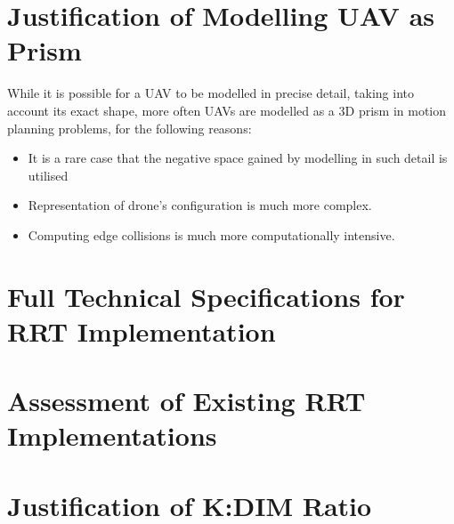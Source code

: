 
\section{Justification of Modelling UAV as Prism}
\label{section:rrt_appendix_modelling}
    While it is possible for a \gls{UAV} to be modelled in precise detail, taking into account its exact shape, more often \glspl{UAV} are modelled as a 3D prism in motion planning problems, for the following reasons:
    \begin{itemize}
    \item It is a rare case that the negative space gained by modelling in such detail is utilised
    \item Representation of drone's configuration is much more complex.
    \item Computing edge collisions is much more computationally intensive.
    \end{itemize}

    

\section{Full Technical Specifications for RRT Implementation}
\label{section:rrt_appendix_tech_specs}
    

\section{Assessment of Existing RRT Implementations}
\label{section:rrt_appendix_existing_implementations}
    

\newpage
\section{Justification of K:DIM Ratio}